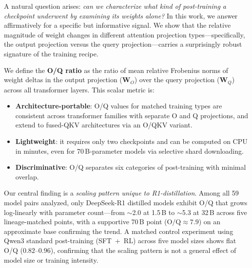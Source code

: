 \documentclass[11pt]{article}
\newcommand{\oq}{\text{O/Q}}
\begin{document}
A natural question arises: \emph{can we characterize what kind of post-training
a checkpoint underwent by examining its weights alone?}
In this work, we answer affirmatively for a specific but informative signal.
We show that the relative magnitude of weight changes in different attention
projection types---specifically, the output projection versus the query
projection---carries a surprisingly robust signature of the training recipe.

We define the \textbf{O/Q ratio} as the ratio of mean relative Frobenius norms
of weight deltas in the output projection ($\mathbf{W}_O$) over the query
projection ($\mathbf{W}_Q$) across all transformer layers.
This scalar metric is:
\begin{itemize}[nosep]
  \item \textbf{Architecture-portable}: O/Q values for matched training types
    are consistent across transformer families with separate O and Q projections,
    and extend to fused-QKV architectures via an O/QKV variant.
  \item \textbf{Lightweight}: it requires only two checkpoints and can be
    computed on CPU in minutes, even for 70\,B-parameter models via selective
    shard downloading.
  \item \textbf{Discriminative}: O/Q separates six categories of post-training
    with minimal overlap.
\end{itemize}

Our central finding is a \emph{scaling pattern unique to R1-distillation}.
Among all 59 model pairs analyzed, only DeepSeek-R1 distilled models exhibit
O/Q that grows log-linearly with parameter count---from $\sim$2.0 at 1.5\,B to
$\sim$5.3 at 32\,B across five lineage-matched points, with a supportive 70\,B
point ($\oq \approx 7.9$) on an approximate base confirming the trend.
A matched control experiment using Qwen3 standard post-training (SFT~+~RL)
across five model sizes shows flat O/Q ($0.82$--$0.96$), confirming that the
scaling pattern is not a general effect of model size or training intensity.
\end{document}
